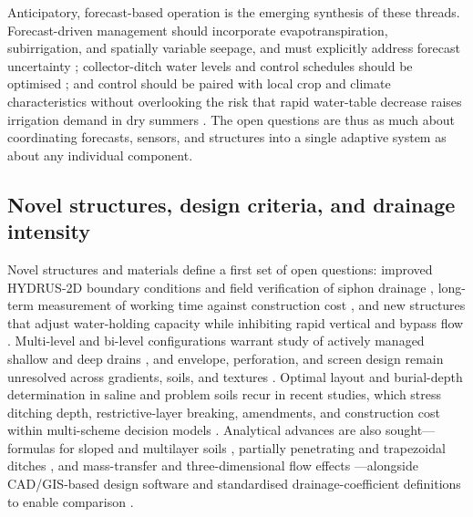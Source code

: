 Anticipatory, forecast-based operation is the emerging synthesis of these
threads. Forecast-driven management should incorporate evapotranspiration,
subirrigation, and spatially variable seepage, and must explicitly address
forecast uncertainty \parencite{VandeCraats2021}; collector-ditch water levels
and control schedules should be optimised \parencite{Salla2022,Strock2025b};
and control should be paired with local crop and climate characteristics
without overlooking the risk that rapid water-table decrease raises irrigation
demand in dry summers
\parencite{Güngör2023,Dou2023,Golmohammadi2016,Kim2023,Wang2020c}. The open
questions are thus as much about coordinating forecasts, sensors, and structures
into a single adaptive system as about any individual component.

\subsection{Novel structures, design criteria, and drainage intensity}

Novel structures and materials define a first set of open questions: improved
HYDRUS-2D boundary conditions and field verification of siphon drainage
\parencite{Ren2023}, long-term measurement of working time against construction
cost \parencite{Tao2025b}, and new structures that adjust water-holding capacity
while inhibiting rapid vertical and bypass flow \parencite{Li2021}. Multi-level
and bi-level configurations warrant study of actively managed shallow and deep
drains \parencite{Hornbuckle2007,Verma1998,Nelson2011b}, and envelope,
perforation, and screen design remain unresolved across gradients, soils, and
textures \parencite{Alavi2021,Wu2022,Oyarce2017,HajAmor2019}. Optimal layout and
burial-depth determination in saline and problem soils recur in recent studies,
which stress ditching depth, restrictive-layer breaking, amendments, and
construction cost within multi-scheme decision models
\parencite{Tian2023,Tian2024,Tian2023c,Zhang2024d,Zhai2023,Han2023,Qian2025b,Ren2021,Zheng2025,SerranoCoronel2018,Zegeye2021}.
Analytical advances are also sought---formulas for sloped and multilayer soils
\parencite{Tao2016,Tao2019}, partially penetrating and trapezoidal ditches
\parencite{Chahar2010,Afruzi2014}, and mass-transfer and three-dimensional flow
effects \parencite{Zhang2024}---alongside CAD/GIS-based design software and
standardised drainage-coefficient definitions to enable comparison
\parencite{GALLICHAND1992b,Skaggs2017}.

